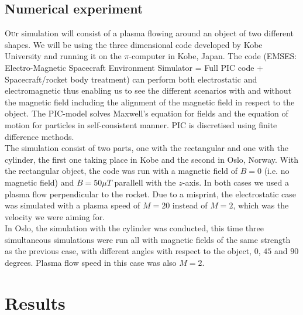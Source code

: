 \documentclass[twoside]{article}
\begin{document}
\begin{multicols}{2}
\section{Numerical experiment}
 \lettrine[nindent=0em,lines=2]{O}ur simulation will consist of a plasma flowing around an object of two different shapes. We will be using the three dimensional code developed by Kobe University and running it on the $\pi$-computer in Kobe, Japan. The code \cite{EMSES} (EMSES: Electro-Magnetic Spacecraft Environment Simulator = Full PIC code
  + Spacecraft/rocket body treatment) can perform both electrostatic and electromagnetic thus enabling us to see the different scenarios with and without the magnetic field including the alignment of the magnetic field in respect to the object. The PIC-model solves Maxwell's equation for fields and the equation of motion for particles in self-consistent manner. PIC is discretised using finite difference methods. \\
\indent The simulation consist of two parts, one with the rectangular and one with the cylinder, the first one taking place in Kobe and the second in Oslo, Norway. With the rectangular object, the code was run with a magnetic field of $B=0$ (i.e. no magnetic field) and $B=50\mu T$ parallell with the $z$-axis. %
In both cases we used a plasma flow perpendicular to the rocket. Due to a misprint, the electrostatic case was simulated with a plasma speed of $M=20$ instead of $M=2$, which was the velocity we were aiming for. \\
\indent In Oslo, the simulation with the cylinder was conducted, this time three simultaneous simulations were run all with magnetic fields of the same strength as the previous case, with different angles with respect to the object, $0$, $45$ and $90$ degrees. Plasma flow speed in this case was also $M=2$.\\

\end{multicols}
\vspace{-3cm}
\section{Results}
\end{document}
